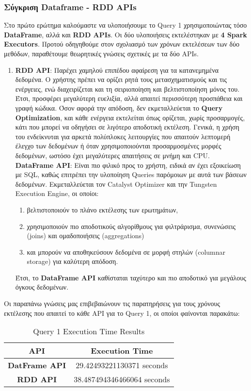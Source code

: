 \documentclass{article}
\begin{document}
\subsubsection*{Σύγκριση Dataframe - RDD APIs}
Στο πρώτο ερώτημα καλούμαστε να υλοποιήσουμε το Query 1 χρησιμοποιώντας τόσο \textbf{DataFrame}, αλλά και \textbf{RDD APIs}. Οι δύο υλοποιήσεις εκτελέστηκαν με \textbf{4 Spark Executors}. Προτού οδηγηθούμε στον σχολιασμό των χρόνων εκτελέσεων των δύο μεθόδων, παραθέτουμε θεωρητικές γνώσεις σχετικές με τα δύο APIs.
\begin{enumerate}
	\item \textbf{RDD API}: Παρέχει χαμηλού επιπέδου αφαίρεση για τα κατανεμημένα δεδομένα. Ο
			χρήστης πρέπει να ορίζει ρητά τους μετασχηματισμούς και τις ενέργειες, ενώ
			διαχειρίζεται και τη σειριοποίηση και βελτιστοποίηση μόνος του. Έτσι, προσφέρει
			μεγαλύτερη ευελιξία, αλλά απαιτεί περισσότερη προσπάθεια και γραφή κώδικα. Όσον
			αφορά την απόδοση, δεν εκμεταλλεύεται το \textbf{Query Optimization}, και κάθε ενέργεια
			εκτελείται όπως ορίζεται, χωρίς προσαρμογές, κάτι που μπορεί να οδηγήσει σε
			λιγότερο αποδοτική εκτέλεση. Γενικά, η χρήση του ενδείκνυται για αρκετά
			πολύπλοκες λειτουργίες που απαιτούν λεπτομερή έλεγχο των δεδομένων ή όταν
			χρησιμοποιούνται προσαρμοσμένες μορφές δεδομένων, ωστόσο έχει μεγαλύτερες
			απαιτήσεις σε μνήμη και CPU.
	\textbf{DataFrame API}: Είναι πιο φιλικό προς το χρήστη, ειδικά αν έχει εξοικείωση με SQL,
			καθώς επιτρέπει την υλοποίηση Queries παρόμοιων με αυτά των βάσεων δεδομένων.
			Εκμεταλλεύεται τον Catalyst Optimizer και την Tungsten Execution Engine, οι οποίοι:
			\begin{enumerate} 
				\item βελτιστοποιούν το πλάνο εκτέλεσης των ερωτημάτων, 
				\item χρησιμοποιούν πιο αποδοτικούς αλγορίθμους για φιλτράρισμα, συνενώσεις (joins) και 				ομαδοποιήσεις (aggregations) 
				\item και μπορούν να αποθηκεύσουν δεδομένα σε μορφή στηλών  (columnar storage) για καλύτερη απόδοση.
			\end{enumerate}
		 	Έτσι, το \textbf{DataFrame API} καθίσταται ταχύτερο και πιο αποδοτικό για μεγάλους όγκους δεδομένων.
\end{enumerate}
Οι παραπάνω γνώσεις μας επιβεβαιώνουν τις παρατηρήσεις για τους χρόνους εκτέλεσης που απαιτεί το κάθε API για το Query 1, οι οποίοι φαίνονται παρακάτω: \\
\begin{table}[H]
\centering
\caption{Query 1 Execution Time Results}
\label{tab:query1_execution_times}
\begin{tabular}{|c|c|}
\hline
\textbf{API}				& 		\textbf{Execution Time}			\\ \hline
\textbf{DatFrame API}	&		29.42493221130371 seconds		\\ \hline
\textbf{RDD API}		&		38.487494346466064 seconds		\\ \hline
\end{tabular}
\end{table}
\end{document}
